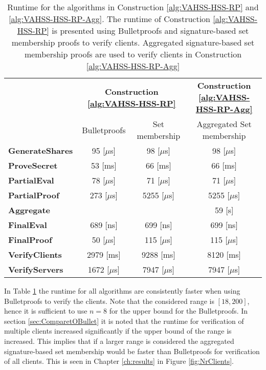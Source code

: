  \begin{table}[h]
\centering
\caption{Runtime for the algorithms in Construction \ref{alg:VAHSS-HSS-RP} and \ref{alg:VAHSS-HSS-RP-Agg}. The runtime of Construction \ref{alg:VAHSS-HSS-RP} is presented using Bulletproofs and signature-based set membership proofs to verify clients.  Aggregated signature-based set membership proofs are used to verify clients in Construction \ref{alg:VAHSS-HSS-RP-Agg}}
\begin{tabular}{l  c c c}
\toprule
&   \multicolumn{2}{c}{\textbf{ Construction \ref{alg:VAHSS-HSS-RP}}}    &	\textbf{Construction \ref{alg:VAHSS-HSS-RP-Agg}}	\\ 
    																	& Bulletproofs  & Set membership & Aggregated Set membership\\	\midrule
  \textbf{GenerateShares}				  					&95 [$\mu$s]			 &98 [$\mu$s]  &98 [$\mu$s]												\\ 
  \textbf{ProveSecret} 						&53 [ms]				& 	66 [ms]	&66 [ms]			\\ 
  \textbf{PartialEval}  										&   78 [$\mu$s]				&71 [$\mu$s]	 		&	71	 [$\mu$s]							\\ 
  \textbf{PartialProof} 									&   273 [$\mu$s]						& 5255 [$\mu$s]			& 5255 [$\mu$s]				\\ 
   \textbf{Aggregate}										&   				&			&		59 [s]					\\ 
  \textbf{FinalEval}  											&   689 [ns]						&699  [ns]				&			699  [ns]												\\ 
  \textbf{FinalProof}  												&   50 [$\mu$s]			&  115 [$\mu$s]	&				115 [$\mu$s]									\\ 
  \textbf{VerifyClients}							  							&   2979 [ms]					& 9288 [ms]&					8120 [ms]							\\ 
  \textbf{VerifyServers}											&   1672 [$\mu$s]					&		7947 [$\mu$s] 	&		7947 [$\mu$s]					\\ 
  \bottomrule
\end{tabular}
\label{tab:BenchBP}
\end{table}

In Table \ref{tab:BenchBP} the runtime for all algorithms are  consistently faster when using Bulletproofs to verify the clients. Note that the considered range is $[18,200]$, hence it is sufficient to use $n=8$ for the upper bound for the Bulletproofs. In section \ref{sec:ComparetOBullet} it is noted that the runtime for verification of multiple clients increased significantly if the upper bound of the range is increased. This implies that if a larger range is considered the aggregated signature-based set membership would be faster than Bulletproofs for verification of all clients. This is seen in Chapter \ref{ch:results} in Figure \ref{fig:NrClients}. 

